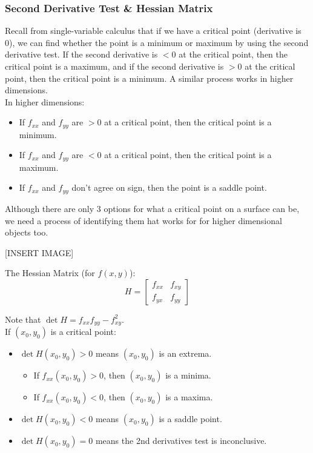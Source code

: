 \subsubsection{Second Derivative Test \& Hessian Matrix}
\noindent
Recall from single-variable calculus that if we have a critical point (derivative is 0), we can find whether the point is a minimum or maximum by using the second derivative test. If the second derivative is $<0$ at the critical point, then the critical point is a maximum, and if the second derivative is $> 0$ at the critical point, then the critical point is a minimum. A similar process works in higher dimensions.\\

\noindent
In higher dimensions:
\begin{itemize}
	\item If $f_{xx}$ and $f_{yy}$ are $> 0$ at a critical point, then the critical point is a minimum.
	\item If $f_{xx}$ and $f_{yy}$ are $< 0$ at a critical point, then the critical point is a maximum.
	\item If $f_{xx}$ and $f_{yy}$ don't agree on sign, then the point is a saddle point.
\end{itemize}

\noindent
Although there are only 3 options for what a critical point on a surface can be, we need a process of identifying them hat works for for higher dimensional objects too.

[INSERT IMAGE]

\begin{definition}
	The Hessian Matrix (for $f(x,y)$):
	\begin{equation*}
		H = \begin{bmatrix}
			f_{xx} & f_{xy} \\
			f_{yx} & f_{yy} 
		\end{bmatrix}
	\end{equation*} 
\end{definition}
\noindent
Note that $\det{H} = f_{xx}f_{yy} - f_{xy}^2$.\\

\noindent
If $(x_0, y_0)$ is a critical point:
\begin{itemize}
	\item $\det{H(x_0,y_0) > 0}$ means $(x_0, y_0)$ is an extrema. 
	\begin{itemize}
		\item If $f_{xx}(x_0, y_0) > 0$, then $(x_0, y_0)$ is a minima.
		\item If $f_{xx}(x_0, y_0) < 0$, then $(x_0, y_0)$ is a maxima.
	\end{itemize}
	\item $\det{H(x_0, y_0)} < 0$ means $(x_0, y_0)$ is a saddle point.
	\item $\det{H(x_0, y_0)} = 0$ means the 2nd derivatives test is inconclusive.
\end{itemize}
